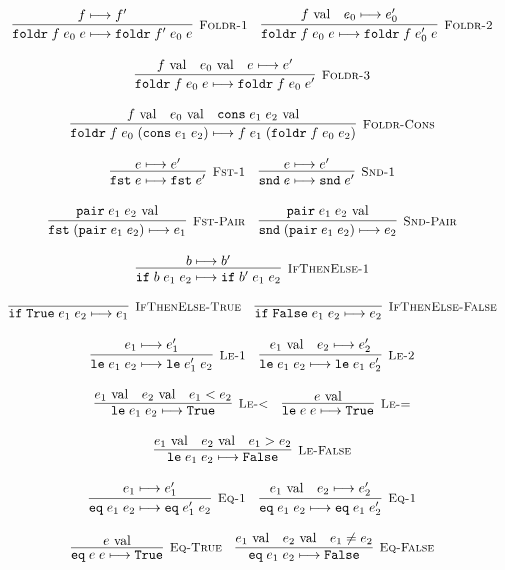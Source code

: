 \documentclass[10pt]{article}
\newcommand{\ttt}[1]{\texttt{#1}}
\newcommand{\reduces}{\ensuremath{\longmapsto}}
\newcommand{\val}{\textnormal{ val}}
\newcommand{\True}{\ttt{True}}
\newcommand{\False}{\ttt{False}}
\newcommand{\cons}{\ttt{cons}}
\newcommand{\foldr}{\ttt{foldr}}
\newcommand{\pair}{\ttt{pair}}
\newcommand{\fst}{\ttt{fst}}
\newcommand{\snd}{\ttt{snd}}
\newcommand{\ite}{\ttt{if}}
\newcommand{\lesseq}{\ttt{le}}
\newcommand{\eq}{\ttt{eq}}
\newcommand{\labinfer} [3] [] {\infer[{\small\textsc{#1}}]{#2}{#3}}
\begin{document}
\[\begin{array}{cc}
    \\\\
    \labinfer[Foldr-1]{\foldr\; f\; e_0\; e \reduces \foldr\; f'\; e_0\; e}{f \reduces f'}
    ~~~
    \labinfer[Foldr-2]{\foldr\; f\; e_0\; e \reduces \foldr\; f\; e_0'\; e}{f \val & e_0 \reduces e_0'}
    \\\\
    \labinfer[Foldr-3]{\foldr\; f\; e_0\; e \reduces \foldr\; f\; e_0\; e'}{f \val & e_0 \val & e \reduces e'}
    \\\\
    \labinfer[Foldr-Cons]{\foldr\; f\; e_0\; (\cons\; e_1\; e_2) \reduces f\; e_1\; (\foldr\; f\; e_0\; e_2)}{f \val & e_0 \val & \cons\; e_1\; e_2 \val}
    \\\\
    \labinfer[Fst-1]{\fst\; e \reduces \fst\; e'}{e \reduces e'}
    ~~~
    \labinfer[Snd-1]{\snd\; e \reduces \snd\; e'}{e \reduces e'}
    \\\\
    \labinfer[Fst-Pair]{\fst\; (\pair\; e_1\; e_2) \reduces e_1}{\pair\; e_1\; e_2 \val}
    ~~~
    \labinfer[Snd-Pair]{\snd\; (\pair\; e_1\; e_2) \reduces e_2}{\pair\; e_1\; e_2 \val}
    \\\\
    \labinfer[IfThenElse-1]{\ite\; b\; e_1\; e_2 \reduces \ite\; b'\; e_1\; e_2}{b \reduces b'}
    \\\\
    \labinfer[IfThenElse-True]{\ite\; \True\; e_1\; e_2 \reduces e_1}{}
    ~~~
    \labinfer[IfThenElse-False]{\ite\; \False\; e_1\; e_2 \reduces e_2}{}
    \\\\
    \labinfer[Le-1]{\lesseq\; e_1\; e_2 \reduces \lesseq\; e_1'\; e_2}{e_1 \reduces e_1'}
    ~~~
    \labinfer[Le-2]{\lesseq\; e_1\; e_2 \reduces \lesseq\; e_1\; e_2'}{e_1 \val & e_2 \reduces e_2'}
    \\\\
    \labinfer[Le-<]{\lesseq\; e_1\; e_2 \reduces \True}{e_1 \val & e_2 \val & e_1 < e_2}
    ~~~
    \labinfer[Le-=]{\lesseq\; e\; e \reduces \True}{e \val}
    \\\\
    \labinfer[Le-False]{\lesseq\; e_1\; e_2 \reduces \False}{e_1 \val & e_2 \val & e_1 > e_2}
    \\\\
    \labinfer[Eq-1]{\eq\; e_1\; e_2 \reduces \eq\; e_1'\; e_2}{e_1 \reduces e_1'}
    ~~~
    \labinfer[Eq-1]{\eq\; e_1\; e_2 \reduces \eq\; e_1\; e_2'}{e_1 \val & e_2 \reduces e_2'}
    \\\\
    \labinfer[Eq-True]{\eq\; e\; e \reduces \True}{e \val}
    ~~~
    \labinfer[Eq-False]{\eq\; e_1\; e_2 \reduces \False}{e_1 \val & e_2 \val & e_1 \neq e_2}
    
  \end{array}
\]
\end{document}
